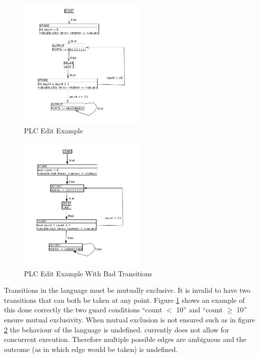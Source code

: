 \begin{figure}[htp]
    \centering
    \includegraphics[width=230px]{./images/tool_transition_example.png}
    \caption{PLC Edit Example}
    \label{fig:tool_transition_example}
\end{figure}

\begin{figure}[htp]
    \centering
    \includegraphics[width=230px]{./images/tool_transition_example_bad.png}
    \caption{PLC Edit Example With Bad Transitions}
    \label{fig:tool_transition_example_bad}
\end{figure}

Transitions in the language must be mutually exclusive. It is invalid to have two transitions that can both be taken at any point. Figure \ref{fig:tool_transition_example} shows an example of this done correctly the two guard conditions ``count $<$ 10'' and ``count $\geq$ 10'' ensure mutual exclusivity. When mutual exclusion is not ensured such as in figure \ref{fig:tool_transition_example_bad} the behaviour of the language is undefined. \plccharts currently does not allow for concurrent execution. Therefore multiple possible edges are ambiguous and the outcome (as in which edge would be taken) is undefined.